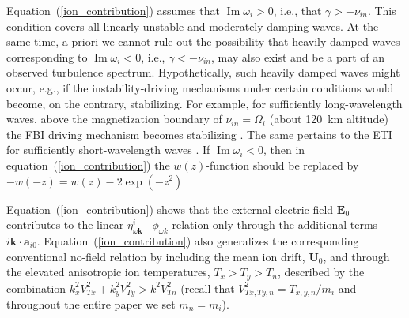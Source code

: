 \documentclass[draft]{agujournal2019}
\renewcommand{\vec}{\mathbf}
\begin{document}
Equation~(\ref{ion_contribution}) assumes that $\operatorname{Im}\omega_{i}>0$, i.e., that $\gamma>-\nu_{in}$. 
This condition covers all linearly unstable and moderately damping waves. At the same time, a priori 
we cannot rule out the possibility that heavily damped waves corresponding to $\operatorname{Im}\omega_{i}<0$, 
i.e., $\gamma<-\nu_{in}$, may also exist and be a part of an observed turbulence spectrum. Hypothetically, 
such heavily damped waves might occur, e.g., if the instability-driving mechanisms under certain conditions 
would become, on the contrary, stabilizing. For example, for sufficiently long-wavelength waves, 
above the magnetization boundary of $\nu_{in}=\Omega_i$ (about 120~km altitude) the FBI driving 
mechanism becomes stabilizing \cite{Dimant:Ion_thermal04}. The same pertains to the ETI 
for sufficiently short-wavelength waves \cite{Dimant:Unified23}. If $\operatorname{Im}\omega_{i}<0$, 
then in equation~(\ref{ion_contribution}) the $w(z)$-function should be replaced by $-w(-z) = w(z)-2\exp(-z^2)$ 

Equation~(\ref{ion_contribution}) shows that the external electric field
$\vec{E}_{0}$ contributes to the linear $\eta_{\omega\vec{k}}^{i}$%
--$\phi_{\omega k}$ relation only through the additional terms
$i\vec{k}\cdot\vec{a}_{i0}$.
Equation~(\ref{ion_contribution}) also generalizes the corresponding
conventional no-field relation by including the mean ion drift, $\vec{U}_{0}$,
and through the elevated anisotropic ion temperatures, $T_{x}%
>T_{y}>T_{n}$, described by the combination $k_{x}^{2}%
V_{Tx}^{2}+k_{y}^{2}V_{Ty}^{2}>k^{2}V_{Tn}^{2}$ (recall that
$V_{Tx,Ty,n}^{2}=T_{x,y,n}/m_{i}$ and throughout the entire paper we set $m_{n}=m_{i}$).
\end{document}
